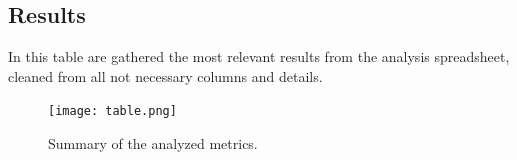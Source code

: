 \subsection{Results}
In this table are gathered the most relevant results from the analysis spreadsheet, cleaned from all not necessary columns and details.
\begin{figure}[H]
\texttt{[image: table.png]}
\centering
\caption{Summary of the analyzed metrics.}
\end{figure}


